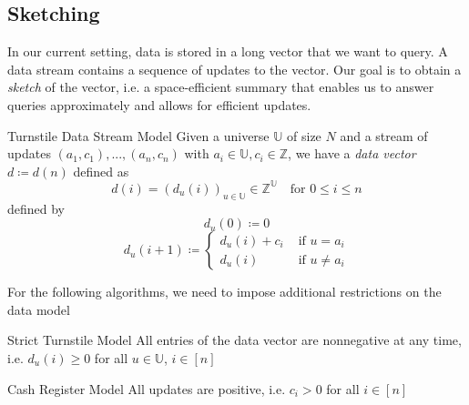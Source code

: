 \documentclass[english]{panikzettel}
\begin{document}
\subsection{Sketching}

In our current setting, data is stored in a long vector that we want to query. A data stream contains a sequence of updates to the vector. Our goal is to obtain a \emph{sketch} of the vector, i.e. a space-efficient summary that enables us to answer queries approximately and allows for efficient updates.

\begin{halfboxl}
\vspace{-\baselineskip}
	\begin{defi}{Turnstile Data Stream Model}
	Given a universe $\mathbb{U}$ of size $N$ and a stream of updates $(a_1,c_1),...,(a_n, c_n)$ with $a_i\in\mathbb{U}, c_i\in\mathbb{Z}$, we have a \emph{data vector} $d\coloneqq d(n)$ defined as
	$$d(i) = (d_u(i))_{u\in\mathbb{U}} \in \mathbb{Z}^{\mathbb{U}} \quad \text{for } 0 \leq i \leq n$$
	defined by
	$$d_u(0) \coloneqq 0$$
	$$d_u(i+1) \coloneqq 
	\begin{cases}
	d_u(i) + c_i & \text{ if } u = a_i\\
	d_u(i) & \text{ if } u\neq a_i
	\end{cases}
	$$
	\end{defi}

\end{halfboxl}
\begin{halfboxr}
\vspace{-\baselineskip}

	For the following algorithms, we need to impose additional restrictions on the data model
	
	\begin{defi}{Strict Turnstile Model}
	All entries of the data vector are nonnegative at any time, i.e. $d_u(i) \geq 0$ for all $u\in\mathbb{U}$, $i\in[n]$
	\end{defi}
	
	\begin{defi}{Cash Register Model}
	All updates are positive, i.e. $c_i > 0$ for all $i\in[n]$
	\end{defi}
\end{halfboxr}
\end{document}

